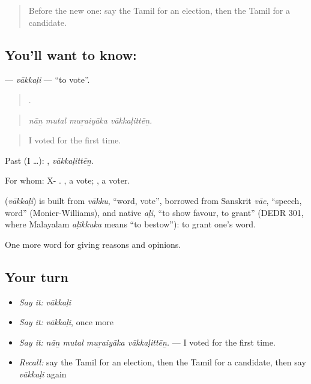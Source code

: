 \label{lesson:TA-C374-vakkali}



\begin{quote}
Before the new one: say the Tamil for an election, then the Tamil for a candidate.
\end{quote}

\subsection*{You'll want to know: }
\textbf{} — \emph{vākkaḷi} — \textquotedblleft{}to vote\textquotedblright{}.

\begin{quote}
   .
\end{quote}

\begin{quote}
\emph{nāṉ mutal muṟaiyāka vākkaḷittēṉ.}
\end{quote}

\begin{quote}
I voted for the first time.
\end{quote}

Past (I …): , \emph{vākkaḷittēṉ}.

For whom: X- . , a vote; , a voter.

\begin{cousinweb}
\textbf{} (\emph{vākkaḷi}) is built from \emph{vākku}, \textquotedblleft{}word, vote\textquotedblright{}, borrowed from Sanskrit \emph{vāc}, \textquotedblleft{}speech, word\textquotedblright{} (Monier-Williams), and native \emph{aḷi}, \textquotedblleft{}to show favour, to grant\textquotedblright{} (DEDR 301, where Malayalam \emph{aḷikkuka} means \textquotedblleft{}to bestow\textquotedblright{}): to grant one's word.
\end{cousinweb}

\begin{grammarlens}[title={What you've built}]
One more word for giving reasons and opinions.
\end{grammarlens}

\subsection*{Your turn}
\begin{itemize}
\raggedright
  \item \emph{Say it:} \emph{vākkaḷi}
  \item \emph{Say it:} \emph{vākkaḷi}, once more
  \item \emph{Say it:} \emph{nāṉ mutal muṟaiyāka vākkaḷittēṉ.} — I voted for the first time.
  \item \emph{Recall:} say the Tamil for an election, then the Tamil for a candidate, then say \emph{vākkaḷi} again
\end{itemize}

